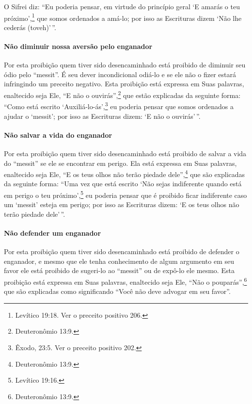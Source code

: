 O Sifrei diz: ``Eu poderia pensar, em virtude do princípio geral `E
amarás o teu próximo',\footnote{Levítico 19:18. Ver o preceito positivo 206.} que somos
ordenados a amá-lo; por isso as Escrituras dizem `Não lhe cederás
(toveh)'\,''.

\paragraph{Não diminuir nossa aversão pelo enganador}

Por esta proibição quem tiver sido desencaminhado está proibido de
diminuir seu ódio pelo ``messit''. É seu dever incondicional odiá-lo e
se ele não o fizer estará infringindo um preceito negativo. Esta
proibição está expressa em Suas palavras, enaltecido seja Ele, ``E não
o ouvirás'',\footnote{Deuteronômio 13:9.} que estão explicadas da seguinte forma:
``Como está escrito `Auxiliá-lo-ás',\footnote{Êxodo, 23:5. Ver o preceito positivo 202.} eu poderia pensar que somos ordenados a ajudar o `messit'; por isso as Escrituras dizem: `E não o ouvirás'\,''.

\paragraph{Não salvar a vida do enganador}

Por esta proibição quem tiver sido desencaminhado está proibido de
salvar a vida do ``messit'' se ele se encontrar em perigo. Ela está
expressa em Suas palavras, enaltecido seja Ele, ``E os teus olhos não
terão piedade dele'',\footnote{Deuteronômio 13:9.} que são explicadas da seguinte
forma: ``Uma vez que está escrito `Não sejas indiferente quando está em
perigo o teu próximo',\footnote{Levítico 19:16.} eu poderia pensar que é
proibido ficar indiferente caso um `messit' esteja em perigo; por isso
as Escrituras dizem: `E os teus olhos não terão piedade dele'\,''.

\paragraph{Não defender um enganador}

Por esta proibição quem tiver sido desencaminhado está proibido de
defender o enganador, e mesmo que ele tenha conhecimento de algum
argumento em seu favor ele está proibido de sugeri-lo ao ``messit'' ou
de expô-lo ele mesmo. Esta proibição está expressa em Suas palavras,
enaltecido seja Ele, ``Não o pouparás'',\footnote{Deuteronômio 13:9.} que são
explicadas como significando ``Você não deve advogar em seu favor''.

